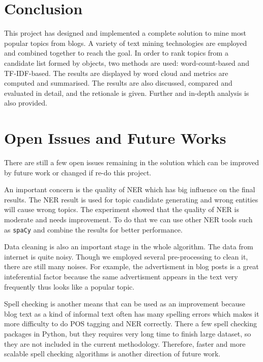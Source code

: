 \documentclass[conference]{IEEEtran}
\begin{document}
\hypertarget{conclusion}{%
\section{Conclusion}\label{conclusion}}

This project has designed and implemented a complete solution to mine
most popular topics from blogs. A variety of text mining technologies
are employed and combined together to reach the goal. In order to rank
topics from a candidate list formed by objects, two methods are used:
word-count-based and TF-IDF-based. The results are displayed by word
cloud and metrics are computed and summarised. The results are also
discussed, compared and evaluated in detail, and the retionale is given.
Further and in-depth analysis is also provided.

\hypertarget{open-issues-and-future-works}{%
\section{Open Issues and Future
Works}\label{open-issues-and-future-works}}

There are still a few open issues remaining in the solution which can be
improved by future work or changed if re-do this project.

An important concern is the quality of NER which has big influence on
the final results. The NER result is used for topic candidate generating
and wrong entities will cause wrong topics. The experiment showed that
the quality of NER is moderate and needs improvement. To do that we can
use other NER tools such as \texttt{spaCy} and combine the results for
better performance.

Data cleaning is also an important stage in the whole algorithm. The
data from internet is quite noisy. Though we employed several
pre-processing to clean it, there are still many noises. For example,
the advertisment in blog posts is a great inteferential factor because
the same advertisment appears in the text very frequently thus looks
like a popular topic.

Spell checking is another means that can be used as an improvement
because blog text as a kind of informal text often has many spelling
errors which makes it more difficulty to do POS tagging and NER
correctly. There a few spell checking packages in Python, but they
requires very long time to finish large dataset, so they are not
included in the current methodology. Therefore, faster and more scalable
spell checking algorithms is another direction of future work.


% 

\printbibliography


\onecolumn

\label{appendix}




\end{document}
